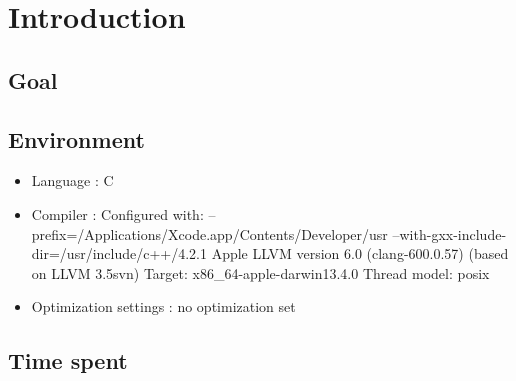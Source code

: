 \chapter{Introduction}
\label{cha:intro}


\section{Goal}


\section{Environment}

\begin{itemize}
\item Language : C
\item Compiler : Configured with: --prefix=/Applications/Xcode.app/Contents/Developer/usr --with-gxx-include-dir=/usr/include/c++/4.2.1
Apple LLVM version 6.0 (clang-600.0.57) (based on LLVM 3.5svn)
Target: x86\_64-apple-darwin13.4.0
Thread model: posix
\item Optimization settings : no optimization set
\end{itemize}

\section{Time spent}